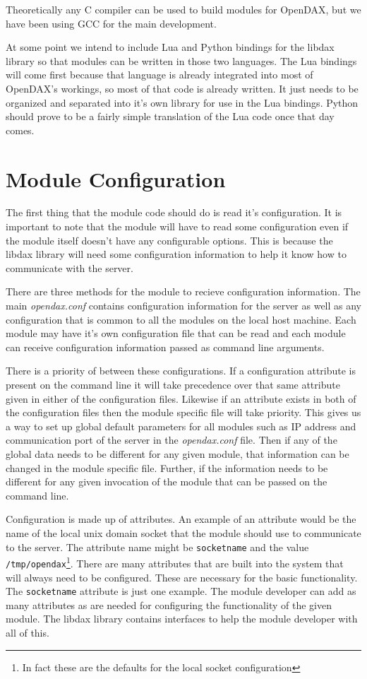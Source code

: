 \documentclass[10pt,letterpaper]{report}
\begin{document}
Theoretically any C compiler can be used to build modules for OpenDAX, but we have been using GCC for the main development.

At some point we intend to include Lua and Python bindings for the libdax library so that modules can be written in those two languages.  The Lua bindings will come first because that language is already integrated into most of OpenDAX's workings, so most of that code is already written.  It just needs to be organized and separated into it's own library for use in the Lua bindings.  Python should prove to be a fairly simple translation of the Lua code once that day comes.

\chapter{Module Configuration}
The first thing that the module code should do is read it's configuration.  It is important to note that the module will have to read some configuration even if the module itself doesn't have any configurable options.  This is because the libdax library will need some configuration information to help it know how to communicate with the server.

There are three methods for the module to recieve configuration information.  The main \textit{opendax.conf} contains configuration information for the server as well as any configuration that is common to all the modules on the local host machine.  Each module may have it's own configuration file that can be read and each module can receive configuration information passed as command line arguments.

There is a priority of between these configurations.  If a configuration attribute is present on the command line it will take precedence over that same attribute given in either of the configuration files.  Likewise if an attribute exists in both of the configuration files then the module specific file will take priority.  This gives us a way to set up global default parameters for all modules such as IP address and communication port of the server in the \textit{opendax.conf} file.  Then if any of the global data needs to be different for any given module, that information can be changed in the module specific file.  Further, if the information needs to be different for any given invocation of the module that can be passed on the command line.

Configuration is made up of attributes.  An example of an attribute would be the name of the local unix domain socket that the module should use to communicate to the server.  The attribute name might be \texttt{socketname} and the value \texttt{/tmp/opendax}\footnote{In fact these are the defaults for the local socket configuration}.  There are many attributes that are built into the system that will always need to be configured.  These are necessary for the basic functionality.  The \texttt{socketname} attribute is just one example.  The module developer can add as many attributes as are needed for configuring the functionality of the given module.  The libdax library contains interfaces to help the module developer with all of this.
\end{document}
